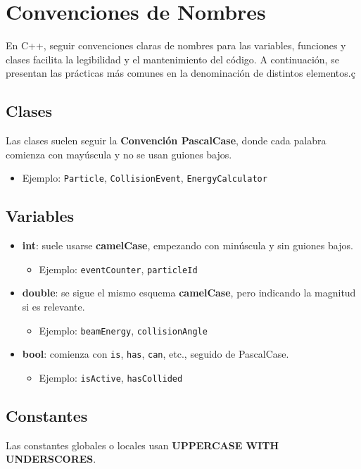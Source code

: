 
\section{Convenciones de Nombres}

En C++, seguir convenciones claras de nombres para las variables, funciones y clases facilita la legibilidad y el mantenimiento del código. A continuación, se presentan las prácticas más comunes en la denominación de distintos elementos.ç
\subsection{Clases}
Las clases suelen seguir la \textbf{Convención PascalCase}, donde cada palabra comienza con mayúscula y no se usan guiones bajos.

\begin{itemize}
\item Ejemplo: \texttt{Particle}, \texttt{CollisionEvent}, \texttt{EnergyCalculator}
\end{itemize}

\subsection{Variables}
\begin{itemize}
\item \textbf{int}: suele usarse \textbf{camelCase}, empezando con minúscula y sin guiones bajos.
\begin{itemize}
\item Ejemplo: \texttt{eventCounter}, \texttt{particleId}
\end{itemize}
\item \textbf{double}: se sigue el mismo esquema \textbf{camelCase}, pero indicando la magnitud si es relevante.
\begin{itemize}
\item Ejemplo: \texttt{beamEnergy}, \texttt{collisionAngle}
\end{itemize}
\item \textbf{bool}: comienza con \texttt{is}, \texttt{has}, \texttt{can}, etc., seguido de PascalCase.
\begin{itemize}
\item Ejemplo: \texttt{isActive}, \texttt{hasCollided}
\end{itemize}
\end{itemize}

\subsection{Constantes}
Las constantes globales o locales usan \textbf{UPPERCASE WITH UNDERSCORES}.

